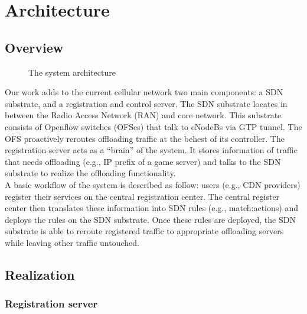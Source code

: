 
\section{Architecture}

\subsection{Overview}


\begin{figure}
\centering
{}
\caption{The system architecture}
\label{fig:architecture}
\end{figure}

Our work adds to the current cellular network two main components: a SDN substrate, and a registration and control server. The SDN substrate locates in between the Radio Access Network (RAN) and core network. This substrate consists of Openflow switches (OFSes) that talk to eNodeBs via GTP tunnel. The OFS proactively reroutes offloading traffic at the behest of its controller. The registration server acts as a “brain” of the system. It stores information of traffic that needs offloading (e.g., IP prefix of a game server) and talks to the SDN substrate to realize the offloading functionality.\\

A basic workflow of the system is described as follow: users (e.g., CDN providers) register their services on the central registration center. The central register center then translates these information into SDN rules (e.g., match:actions) and deploys the rules on the SDN substrate. Once these rules are deployed, the SDN substrate is able to reroute registered traffic to appropriate offloading servers while leaving other traffic untouched.


\subsection{Realization}

\subsubsection{Registration server}

